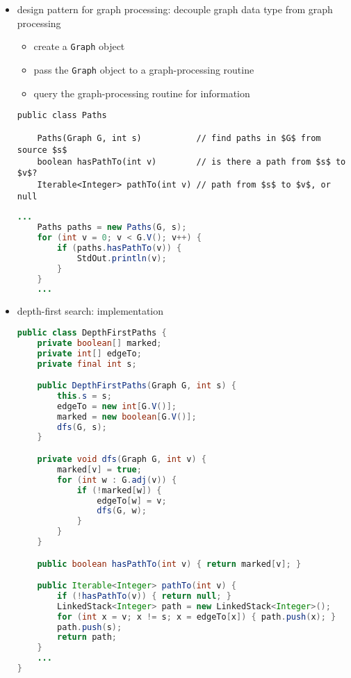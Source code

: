 \documentclass[8pt,a4paper,compress]{beamer}
\begin{document}
\begin{frame}[fragile]
\begin{itemize}
\item design pattern for graph processing: decouple graph data type from graph processing
\begin{itemize}
\item create a \lstinline{Graph} object

\item pass the \lstinline{Graph} object to a graph-processing routine

\item query the graph-processing routine for information
\end{itemize}

\begin{lstlisting}[language={},mathescape]
public class Paths

    Paths(Graph G, int s)           // find paths in $G$ from source $s$
    boolean hasPathTo(int v)        // is there a path from $s$ to $v$?
    Iterable<Integer> pathTo(int v) // path from $s$ to $v$, or null
\end{lstlisting}

\begin{lstlisting}[language=Java]
    ...
    Paths paths = new Paths(G, s);
    for (int v = 0; v < G.V(); v++) {
        if (paths.hasPathTo(v)) {
            StdOut.println(v);
        }
    }
    ...
\end{lstlisting}
\end{itemize}
\end{frame}

\begin{frame}[fragile]
\begin{itemize}
\item depth-first search: implementation
\begin{lstlisting}[language=Java]
public class DepthFirstPaths {
    private boolean[] marked; 
    private int[] edgeTo; 
    private final int s; 

    public DepthFirstPaths(Graph G, int s) {
        this.s = s;
        edgeTo = new int[G.V()];
        marked = new boolean[G.V()];
        dfs(G, s);
    }

    private void dfs(Graph G, int v) {
        marked[v] = true;
        for (int w : G.adj(v)) {
            if (!marked[w]) {
                edgeTo[w] = v;
                dfs(G, w);
            }
        }
    }

    public boolean hasPathTo(int v) { return marked[v]; }

    public Iterable<Integer> pathTo(int v) {
        if (!hasPathTo(v)) { return null; }
        LinkedStack<Integer> path = new LinkedStack<Integer>();
        for (int x = v; x != s; x = edgeTo[x]) { path.push(x); }
        path.push(s);
        return path;
    }
    ...
}
\end{lstlisting}
\end{itemize}
\end{frame}
\end{document}
